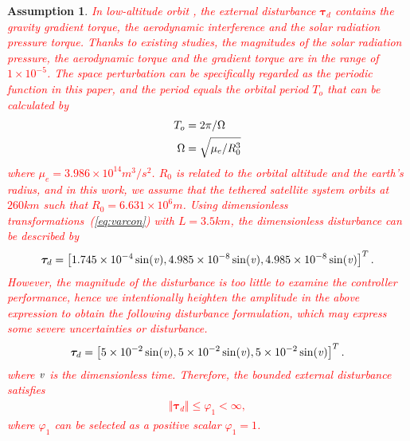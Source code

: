 \documentclass[3p]{elsarticle}
\theoremstyle{plain}
\newtheorem{myas}{Assumption}
\theoremstyle{remark}
\begin{document}
\begin{myas}
\textcolor{red}{In low-altitude orbit , the external disturbance $\bm\tau_d$ contains the gravity gradient torque, the aerodynamic interference and the solar radiation pressure torque. Thanks to existing studies, the magnitudes of the solar radiation pressure, the aerodynamic torque and the gradient torque are in the range of $1\times10^{-5}$. The space perturbation can be specifically regarded as the periodic function in this paper, and the period equals the orbital period $T_o$ that can be calculated by~\cite{Inamori2015192}
\begin{align}\begin{split}
  T_o &= 2\pi/\Omega\\
  \Omega &= \sqrt{\mu_e/R_0^3}\notag
\end{split}\end{align}
where $\mu_e=3.986\times 10^{14}m^3/s^2$. $R_0$ is related to the orbital altitude and the earth's radius, and in this work, we assume that the tethered satellite system orbits at $260km$ such that $R_0=6.631\times 10^6m$. Using dimensionless transformations~(\ref{eq:varcon}) with $L=3.5km$, the dimensionless disturbance can be described by
\begin{align}
\bm\tau_d=\left[1.745\times 10^{-4}\sin(\it{v}),\rm 4.985\times \rm 10^{-8}\sin(\it{v}), \rm 4.985\times 10^{-8}\sin(\it{v})\right]^T.
\end{align}
However, the magnitude of the disturbance is too little to examine the controller performance, hence we intentionally heighten the amplitude in the above expression to obtain the following disturbance formulation, which may express some severe uncertainties or disturbance.
\begin{align}
\bm\tau_d=\left[5\times 10^{-2}\sin(\it{v}),\rm 5\times \rm 10^{-2}\sin(\it{v}), \rm 5\times 10^{-2}\sin(\it{v})\right]^T.\notag
\end{align}
where $\it v$ is the dimensionless time.
Therefore, the bounded external disturbance satisfies
\begin{align}
\Vert\bm\tau_d\Vert\le\varphi_1<\infty,
\end{align}
where $\varphi_1$ can be selected as a positive scalar $\varphi_1=1$.}
\end{myas}
\end{document}
